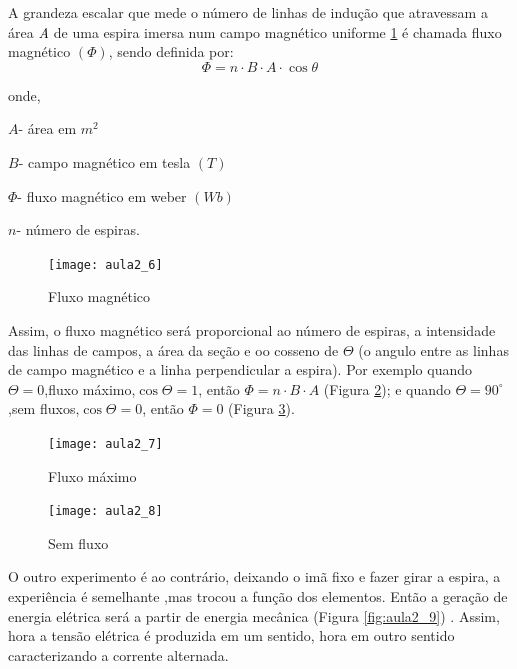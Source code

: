 A grandeza escalar que mede o número de linhas de indução que atravessam
a área \textit{\textcolor{black}{A }}de uma espira imersa num campo
magnético uniforme \ref{fig:aula2_6} é chamada fluxo magnético $(\Phi)$, sendo definida
por:
\begin{equation}\label{eq:fluxomag}
\Phi=n\cdot B\cdot A\cdot\cos\theta 
\end{equation}


onde,

$A$- área em $m^{2}$

$B$- campo magnético em tesla $(T)$

$\Phi$- fluxo magnético em weber $(Wb)$

$n$- número de espiras.




\begin{figure}[H]
\begin{centering}
\texttt{[image: aula2\_6]}\protect\caption{\label{fig:aula2_6}Fluxo magnético }
\end{centering}

\end{figure}
Assim, o fluxo magnético será proporcional ao número de espiras, a
intensidade das linhas de campos, a área da seção e oo cosseno de $\Theta$
(o angulo entre as linhas de campo magnético e a linha perpendicular
a espira). 
Por exemplo quando $\Theta=0$,fluxo máximo,$\cos\Theta=1$, então
$\Phi=n\cdot B\cdot A$ (Figura \ref{fig:aula2_7}); e quando $\Theta=90^{\circ}$,sem fluxos,$\cos\Theta=0$,
então $\Phi=0$ (Figura \ref{fig:aula2_8}).

\begin{figure}[H]
\begin{centering}
\texttt{[image: aula2\_7]}\protect\caption{\label{fig:aula2_7}Fluxo máximo }
\end{centering}

\end{figure}
\begin{figure}[H]
\begin{centering}
\texttt{[image: aula2\_8]}\protect\caption{\label{fig:aula2_8}Sem fluxo }
\end{centering}

\end{figure}

O outro experimento é ao contrário, deixando o imã fixo e fazer girar
a espira, a experiência é semelhante ,mas trocou a função dos elementos.
Então a geração de energia elétrica será a partir de energia mecânica (Figura
\ref{fig:aula2_9}) . Assim, hora a tensão elétrica é produzida em um sentido, hora
em outro sentido caracterizando a corrente alternada.

